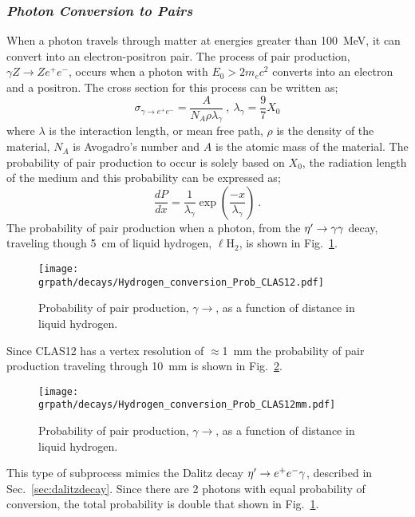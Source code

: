 \subsubsection{\emph{Photon Conversion to \epem Pairs}}\label{sec:intro.conversion}
When a photon travels through matter at energies greater than 100~MeV, it can convert into an electron-positron pair. The process of pair production, $\gamma Z \rightarrow Ze^{+}e^{-}$, occurs when a photon with $E_0 > 2 m_e c^2$ converts into an electron and a positron. The cross section for this process can be written as;
\begin{equation}\label{pair_crosssection}
\sigma_{\gamma\rightarrow e^+e^-} =  \frac{A}{N_{A} \rho \lambda_\gamma}  \ ,\ \lambda_\gamma = \frac{9}{7}X_0
\end{equation}
where $\lambda$ is the interaction length, or mean free path, $\rho$ is the density of the material, $N_A$ is Avogadro's number and $A$ is the atomic mass of the material. The probability of pair production to occur is solely based on $X_{0}$, the radiation length of the medium and this probability can be expressed as;
\begin{equation}
\frac{dP}{dx} = \frac{1}{\lambda_\gamma}\exp(\frac{-x}{\lambda_\gamma}) \ .
\end{equation}
%
%
The probability of pair production when a photon, from the $\eta^{\prime} \to \gamma \gamma$ decay, traveling though 5~cm of liquid hydrogen, $\ell$H$_2$, is shown in Fig.~\ref{fig:conversion}. 
\begin{figure}[h!]\begin{center}
\texttt{[image: \\grpath/decays/Hydrogen\_conversion\_Prob\_CLAS12.pdf]}
\caption[Probability of pair production, $\gamma \to$\epem, as a function of distance in liquid hydrogen]{\label{fig:conversion}{Probability of pair production, $\gamma \to$\epem, as a function of distance in liquid hydrogen.}}
\end{center}\end{figure}
Since CLAS12 has a vertex resolution of $\approx$1~mm the probability of pair production traveling through 10~mm is shown in Fig.~\ref{fig:conversionmm}. 
\begin{figure}[h!]\begin{center}
		\texttt{[image: \\grpath/decays/Hydrogen\_conversion\_Prob\_CLAS12mm.pdf]}
		\caption[Probability of pair production, $\gamma \to$\epem, as a function of distance in liquid hydrogen]{\label{fig:conversionmm}{Probability of pair production, $\gamma \to$\epem, as a function of distance in liquid hydrogen.}}
	\end{center}\end{figure}
This type of subprocess mimics the Dalitz decay  $\eta^{\prime} \to e^+e^- \gamma$, described in Sec.~\ref{sec:dalitzdecay}. Since there are 2 photons with equal probability of conversion, the total probability is double that shown in Fig.~\ref{fig:conversion}.


